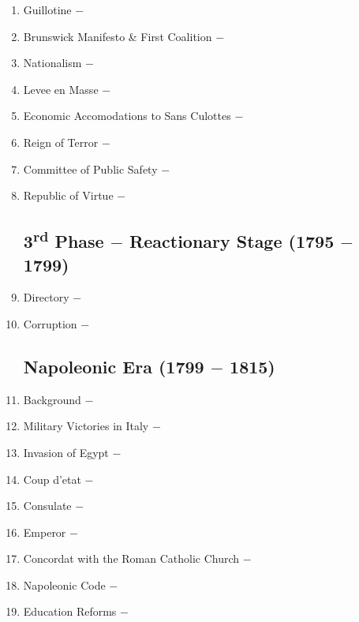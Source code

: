 \documentclass[12pt]{article}
\begin{document}
\begin{enumerate}
\item Guillotine $-$ 

\item Brunswick Manifesto \& First Coalition $-$ 

\item Nationalism $-$ 

\item Levee en Masse $-$ 

\item Economic Accomodations to Sans Culottes $-$

\item Reign of Terror $-$ 

\item Committee of Public Safety $-$ 

\item Republic of Virtue $-$ 

\subsection{3\textsuperscript{rd} Phase $-$ Reactionary Stage (1795 $-$ 1799)}

\item Directory $-$ 

\item Corruption $-$ 

\subsection{Napoleonic Era (1799 $-$ 1815)}

\item Background $-$ 

\item Military Victories in Italy $-$ 

\item Invasion of Egypt $-$ 

\item Coup d'etat $-$ 

\item Consulate $-$ 

\item Emperor $-$ 

\item Concordat with the Roman Catholic Church $-$ 

\item Napoleonic Code $-$ 

\item Education Reforms $-$ 


\end{enumerate}
\end{document}
